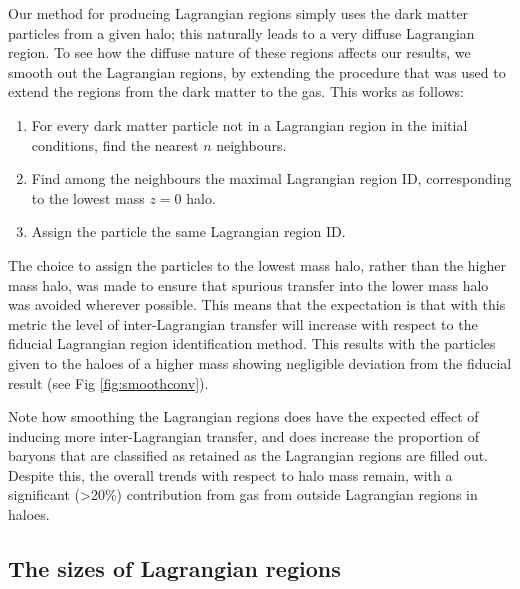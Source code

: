 Our method for producing Lagrangian regions simply uses the dark matter
particles from a given halo; this naturally leads to a very diffuse
Lagrangian region. To see how the diffuse nature of these regions affects our
results, we smooth out the Lagrangian regions, by extending the procedure
that was used to extend the regions from the dark matter to the gas. This
works as follows:
\begin{enumerate}
	\item For every dark matter particle not in a Lagrangian region 
	      in the initial conditions, find the nearest $n$ neighbours.
	\item Find among the neighbours the maximal Lagrangian region ID,
	      corresponding to the lowest mass $z=0$ halo.
	\item Assign the particle the same Lagrangian region ID.
\end{enumerate}
The choice to assign the particles to the lowest mass halo, rather than the
higher mass halo, was made to ensure that spurious transfer into the lower mass
halo was avoided wherever possible. This means that the expectation is that
with this metric the level of inter-Lagrangian transfer will increase with
respect to the fiducial Lagrangian region identification method. This results
with the particles given to the haloes of a higher mass showing negligible
deviation from the fiducial result (see Fig \ref{fig:smoothconv}).


Note how smoothing the Lagrangian regions does have the expected effect of
inducing more inter-Lagrangian transfer, and does increase the proportion of
baryons that are classified as retained as the Lagrangian regions are filled
out. Despite this, the overall trends with respect to halo mass remain, with
a significant (>20\%) contribution from gas from outside Lagrangian regions
in haloes.

\subsection{The sizes of Lagrangian regions}

